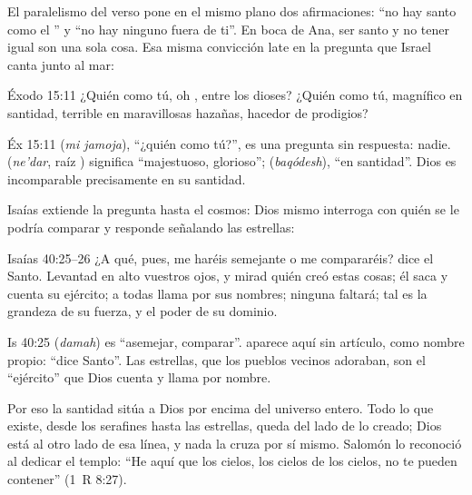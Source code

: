 El paralelismo del verso pone en el mismo plano dos afirmaciones: ``no hay santo como el \SENOR'' y ``no hay ninguno fuera de ti''. En boca de Ana, ser santo y no tener igual son una sola cosa. Esa misma convicción late en la pregunta que Israel canta junto al mar:

\begin{verso}{Éxodo 15:11}
¿Quién como tú, oh \SENOR, entre los dioses? ¿Quién como tú, magnífico en santidad, terrible en maravillosas hazañas, hacedor de prodigios?
\end{verso}

\begin{filologiatexto}{Éx 15:11}
 (\emph{mi jamoja}), ``¿quién como tú?'', es una pregunta sin respuesta: nadie.  (\emph{ne'dar}, raíz ) significa ``majestuoso, glorioso'';  (\emph{baqódesh}), ``en santidad''. Dios es incomparable precisamente en su santidad.
\end{filologiatexto}

Isaías extiende la pregunta hasta el cosmos: Dios mismo interroga con quién se le podría comparar y responde señalando las estrellas:

\begin{verso}{Isaías 40:25–26}
¿A qué, pues, me haréis semejante o me compararéis? dice el Santo. Levantad en alto vuestros ojos, y mirad quién creó estas cosas; él saca y cuenta su ejército; a todas llama por sus nombres; ninguna faltará; tal es la grandeza de su fuerza, y el poder de su dominio.
\end{verso}

\begin{filologiatexto}{Is 40:25}
 (\emph{damah}) es ``asemejar, comparar''.  aparece aquí sin artículo, como nombre propio: ``dice Santo''. Las estrellas, que los pueblos vecinos adoraban, son el ``ejército'' que Dios cuenta y llama por nombre.
\end{filologiatexto}

Por eso la santidad sitúa a Dios por encima del universo entero. Todo lo que existe, desde los serafines hasta las estrellas, queda del lado de lo creado; Dios está al otro lado de esa línea, y nada la cruza por sí mismo. Salomón lo reconoció al dedicar el templo: ``He aquí que los cielos, los cielos de los cielos, no te pueden contener'' (1~R 8:27).

